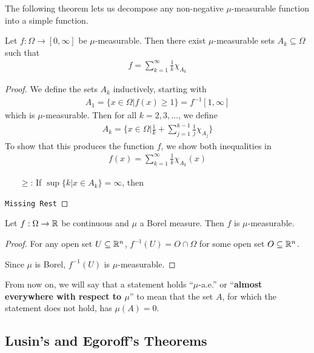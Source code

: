 The following theorem lets us decompose any non-negative $\mu$-measurable function into a simple function.
\begin{thm}[]
  Let $f: \Omega \to  [0,\infty]$ be $\mu$-measurable. Then there exist $\mu$-measurable sets $A_k \subseteq \Omega$ such that
  \begin{align*}
    f = \sum_{k=1}^{\infty} \frac{1}{k} \chi_{A_k}
  \end{align*}
\end{thm}
\begin{proof}
  We define the sets $A_k$ inductively, starting with
  \begin{align*}
    A_1 = \{x \in \Omega \big\vert f(x) \geq 1\} = f^{-1}[1, \infty]
  \end{align*}
  which is $\mu$-measurable. Then for all $k = 2,3, \ldots$, we define
  \begin{align*}
    A_k = \{x \in \Omega \big\vert \frac{1}{k} + \sum_{j=1}^{k-1} \frac{1}{j} \chi_{A_j}\}
  \end{align*}
  To show that this produces the function $f$, we show both inequalities in
  \begin{align*}
    f(x) = \sum_{k=1}^{\infty} \frac{1}{k} \chi_{A_k}(x)
  \end{align*}
  \begin{itemize}
    \item[$\geq$:] If $\sup \{k \big\vert x \in A_k\} = \infty$, then 
  \end{itemize}
  \texttt{Missing Rest}
\end{proof}

\begin{prop}[]
  Let $f: \Omega \to \mathbb{R}$ be continuous and $\mu$ a Borel measure.
  Then $f$ is $\mu$-measurable.
\end{prop}
\begin{proof}
  For any open set $U \subseteq \mathbb{R}^{n}$, $f^{-1}(U) = O \cap \Omega$ for some open set $O \subseteq \mathbb{R}^{n}$.

  Since $\mu$ is Borel, $f^{-1}(U)$ is $\mu$-measurable.
\end{proof}

From now on, we will say that a statement holds ``$\mu$-a.e.'' or ``\textbf{almost everywhere with respect to $\mu$}'' to mean that the set $A$, for which the statement does not hold, has $\mu(A) = 0$.


\subsection{Lusin's and Egoroff's Theorems}

